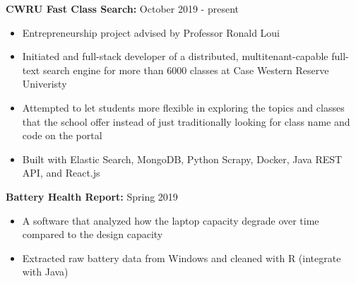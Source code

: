 \documentclass[a4paper,11pt]{article}
\begin{document}
\begin{flushleft}
	
	\textbf{CWRU Fast Class Search:} October 2019 - present
	\vspace{-\topsep}
	\begin{itemize}
		\setlength{\parskip}{2pt}
		\setlength{\itemsep}{0pt plus 1pt}
		\item Entrepreneurship project advised by Professor Ronald Loui
		\item Initiated and full-stack developer of a distributed, multitenant-capable full-text search engine for more than 6000 classes at Case Western Reserve Univeristy
		\item Attempted to let students more flexible in exploring the topics and classes that the school offer instead of just traditionally looking for class name and code on the portal
		\item Built with Elastic Search, MongoDB, Python Scrapy, Docker, Java REST API, and React.js
	\end{itemize}
	
	\textbf{Battery Health Report: } Spring 2019
	\vspace{-\topsep}
	\begin{itemize}
		\setlength{\parskip}{2pt}
		\setlength{\itemsep}{0pt plus 1pt}
		\item A software that analyzed how the laptop capacity degrade over time compared to the design capacity 
		\item Extracted raw battery data from Windows and cleaned with R (integrate with Java)
	\end{itemize}
	
\centering{\noindent\makebox{\rule{8cm}{1.5pt}}}
\end{flushleft}
\end{document}
